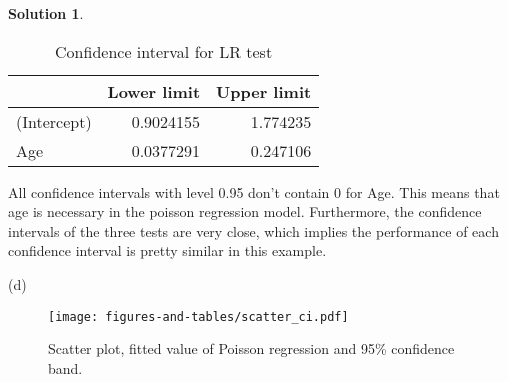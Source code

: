 \documentclass[11pt,letterpaper,english,oneside]{article} %
\theoremstyle{definition} %
\newtheorem{solution}{Solution}
\newenvironment{sol}{\begin{solution}\hspace{0pt}}{\end{solution}}
\begin{document}
\begin{sol}
\begin{table}[!h]
	\caption{Confidence interval for LR test}
	\centering
	\begin{tabular}[t]{l|r|r}
		\hline
		& Lower limit & Upper limit\\
		\hline
		(Intercept) & 0.9024155 & 1.774235\\
		\hline
		Age & 0.0377291 & 0.247106\\
		\hline
	\end{tabular}
	\label{tab:lr_confint}
\end{table}

All confidence intervals with level 0.95 don't contain 0 for Age. This means that age is necessary in the poisson regression model. Furthermore, the confidence intervals of the three tests are very close, which implies the performance of each confidence interval is pretty similar in this example.

(d)

\begin{figure}[ht]
	\centering
	\texttt{[image: figures-and-tables/scatter\_ci.pdf]}
	\caption{Scatter plot, fitted value of Poisson regression and 95\% confidence band.}
	\label{fig:scatter_ci}
\end{figure}
\end{sol}
\end{document}
